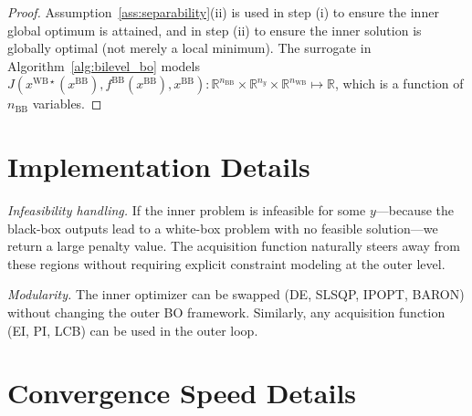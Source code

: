 \documentclass[12pt,a4paper]{article}%
\theoremstyle{plain}%
\theoremstyle{remark}%
\theoremstyle{definition}%
\def\WB{\mathrm{WB}}
\def\BB{\mathrm{BB}}
\begin{document}
\begin{appendices}
\begin{proof}
Assumption~\ref{ass:separability}(ii) is used in step (i) to ensure the inner global optimum is attained, and in step (ii) to ensure the inner solution is globally optimal (not merely a local minimum). The surrogate in Algorithm~\ref{alg:bilevel_bo} models $J(x^{\WB\star}(x^{\BB}), f^{\BB}(x^{\BB}), x^{\BB}):\mathbb{R}^{n_\BB} \times \mathbb{R}^{n_y} \times \mathbb{R}^{n_\WB} \mapsto \mathbb{R}$, which is a function of $n_{\BB}$ variables.
\end{proof}

\section{Implementation Details}\label{sec:implementation_details}

\emph{Infeasibility handling.} If the inner problem is infeasible for some $y$---because the black-box outputs lead to a white-box problem with no feasible solution---we return a large penalty value. The acquisition function naturally steers away from these regions without requiring explicit constraint modeling at the outer level.

\emph{Modularity.} The inner optimizer can be swapped (DE, SLSQP, IPOPT, BARON) without changing the outer BO framework. Similarly, any acquisition function (EI, PI, LCB) can be used in the outer loop.

\section{Convergence Speed Details}\label{sec:convergence_speed_details}


\end{appendices}
\end{document}
